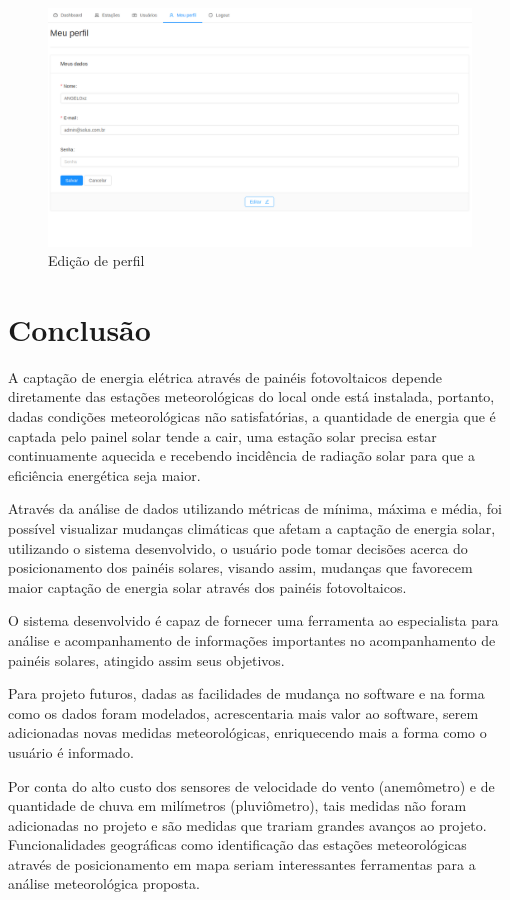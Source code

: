 \begin{figure}[H]
    \centering
    \caption{Edição de perfil \label{fig:perfil_edit}}
    \includegraphics[scale=0.3]{telas/perfil_edit.png}
    \hfill
{}
\end{figure}


\chapter{Conclusão}

A captação de energia elétrica através de painéis fotovoltaicos depende diretamente das estações meteorológicas do local onde está instalada, portanto, dadas condições meteorológicas não satisfatórias, a quantidade de energia que é captada pelo painel solar tende a cair, uma estação solar precisa estar continuamente aquecida e recebendo incidência de radiação solar para que a eficiência energética seja maior.

Através da análise de dados utilizando métricas de mínima, máxima e média, foi possível visualizar mudanças climáticas que afetam a captação de energia solar, utilizando o sistema desenvolvido, o usuário pode tomar decisões acerca do posicionamento dos painéis solares, visando assim, mudanças que favorecem maior captação de energia solar através dos painéis fotovoltaicos.

O sistema desenvolvido é capaz de fornecer uma ferramenta ao especialista para análise e acompanhamento de informações importantes no acompanhamento de painéis solares, atingido assim seus objetivos.

Para projeto futuros, dadas as facilidades de mudança no software e na forma como os dados foram modelados, acrescentaria mais valor ao software, serem adicionadas novas medidas meteorológicas, enriquecendo mais a forma como o usuário é informado.

Por conta do alto custo dos sensores de velocidade do vento (anemômetro) e de quantidade de chuva em milímetros (pluviômetro), tais medidas não foram adicionadas no projeto e são medidas que trariam grandes avanços ao projeto. Funcionalidades geográficas como identificação das estações meteorológicas através de posicionamento em mapa seriam interessantes ferramentas para a análise meteorológica proposta.
